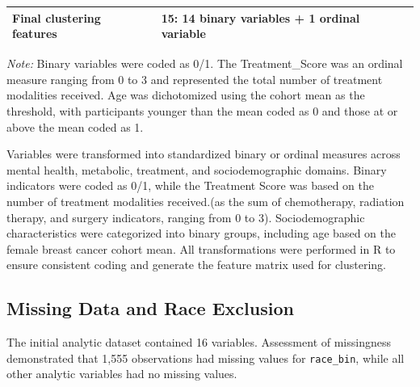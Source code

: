 \documentclass[11pt]{article}
\begin{document}
\begin{table}[H]
\begin{tabular}{p{3.2cm}p{5.0cm}p{6.0cm}}
\multicolumn{2}{l}{\textbf{Final clustering features}} &
\textbf{15: 14 binary variables + 1 ordinal variable} \\

\hline
\end{tabular}

\vspace{0.2cm}
\begin{minipage}{0.95\textwidth}
\small
\textit{Note:} Binary variables were coded as 0/1. The Treatment\_Score was an ordinal measure ranging from 0 to 3 and represented the total number of treatment modalities received. Age was dichotomized using the cohort mean as the threshold, with participants younger than the mean coded as 0 and those at or above the mean coded as 1.
\end{minipage}
\end{table}

Variables were transformed into standardized binary or ordinal measures across mental health, metabolic, treatment, and sociodemographic domains. Binary indicators were coded as 0/1, while the Treatment Score was based on the number of treatment modalities received.(as the sum of chemotherapy, radiation therapy, and surgery indicators, ranging from 0 to 3). Sociodemographic characteristics were categorized into binary groups, including age based on the female breast cancer cohort mean. All transformations were performed in R to ensure consistent coding and generate the feature matrix used for clustering.

\subsection{Missing Data and Race Exclusion}

The initial analytic dataset contained 16 variables. Assessment of missingness demonstrated that 1,555 observations had missing values for \texttt{race\_bin}, while all other analytic variables had no missing values.
\end{document}
